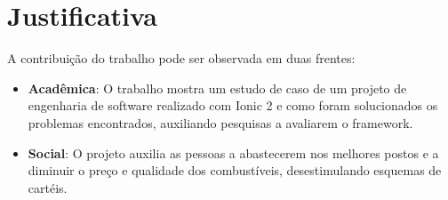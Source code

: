\section{Justificativa}

A contribuição do trabalho pode ser observada em duas frentes:

\begin{itemize}
	\item\textbf{Acadêmica}: O trabalho mostra um estudo de caso de um projeto de engenharia de software realizado com Ionic 2 e como foram solucionados os problemas encontrados, auxiliando pesquisas a avaliarem o framework.
	\item\textbf{Social}: O projeto auxilia as pessoas a abastecerem nos melhores postos e a diminuir o preço e qualidade dos combustíveis, desestimulando esquemas de cartéis.
\end{itemize}
